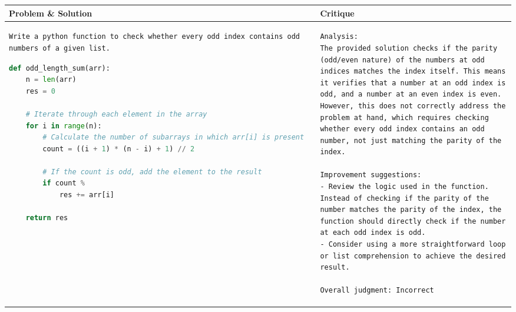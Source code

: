 \begin{table}[]
    \centering
    \small
    \caption{A sample problem from MBPP+~\cite{liu2024your}, with by the solution generated by Qwen2.5-Coder and the critique provided by the {\ours} critic.}
    \label{tab:mbppplus_sample}
\begin{longtable}{m{}m{}}
\toprule
\textbf{Problem \& Solution}  &
\textbf{Critique} \\ 
\midrule
\begin{lstlisting}[frame=none,
    backgroundcolor=\color{white},
    numbers=none,
    xleftmargin=0pt,
    framexleftmargin=0pt,
    framexrightmargin=0pt,
    framextopmargin=0pt,
    framexbottommargin=0pt]
Write a python function to check whether every odd index contains odd numbers of a given list.
\end{lstlisting}


\begin{lstlisting}[language=python]
def odd_length_sum(arr):
    n = len(arr)
    res = 0
    
    # Iterate through each element in the array
    for i in range(n):
        # Calculate the number of subarrays in which arr[i] is present
        count = ((i + 1) * (n - i) + 1) // 2
        
        # If the count is odd, add the element to the result
        if count %
            res += arr[i]
    
    return res
\end{lstlisting} 
&
\begin{lstlisting}[frame=none,
    backgroundcolor=\color{white},
    numbers=none,
    xleftmargin=0pt,
    framexleftmargin=0pt,
    framexrightmargin=0pt,
    framextopmargin=0pt,
    framexbottommargin=0pt]
Analysis:
The provided solution checks if the parity (odd/even nature) of the numbers at odd indices matches the index itself. This means it verifies that a number at an odd index is odd, and a number at an even index is even. However, this does not correctly address the problem at hand, which requires checking whether every odd index contains an odd number, not just matching the parity of the index.

Improvement suggestions:
- Review the logic used in the function. Instead of checking if the parity of the number matches the parity of the index, the function should directly check if the number at each odd index is odd.
- Consider using a more straightforward loop or list comprehension to achieve the desired result.

Overall judgment: Incorrect
\end{lstlisting}
\\ 
\bottomrule
\end{longtable}
\end{table}
